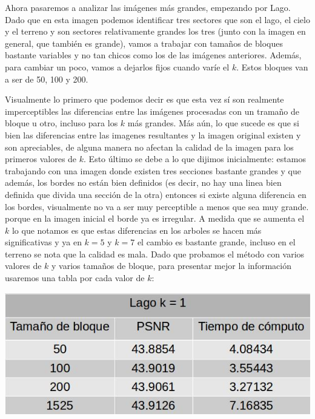 \documentclass[a4paper]{article}
\begin{document}
Ahora pasaremos a analizar las imágenes más grandes, empezando por Lago. Dado que en esta imagen podemos identificar tres sectores que son el lago, el cielo y el terreno y son sectores relativamente grandes los tres (junto con la imagen en general, que también es grande), vamos a trabajar con tamaños de bloques bastante variables y no tan chicos como los de las imágenes anteriores. Además, para cambiar un poco, vamos a dejarlos fijos cuando varíe el $k$. Estos bloques van a ser de 50, 100 y 200. 
\par Visualmente lo primero que podemos decir es que esta vez sí son realmente imperceptibles las diferencias entre las imágenes procesadas con un tramaño de bloque u otro, incluso para los $k$ más grandes. Más aún, lo que sucede es que si bien las diferencias entre las imagenes resultantes y la imagen original existen y son apreciables, de alguna manera no afectan la calidad de la imagen para los primeros valores de $k$. Esto último se debe a lo que dijimos inicialmente: estamos trabajando con una imagen donde existen tres secciones bastante grandes y que además, los bordes no están bien definidos (es decir, no hay una linea bien definida que divida una sección de la otra) entonces si existe alguna diferencia en los bordes, visualmente no va a ser muy perceptible a menos que sea muy grande. porque en la imagen inicial el borde ya es irregular. A medida que se aumenta el $k$ lo que notamos es que estas diferencias en los arboles se hacen más significativas y ya en $k = 5$ y $k = 7$   el cambio es bastante grande, incluso en el terreno se nota que la calidad es mala.
\newline \noindent Dado que probamos el método con varios valores de $k$ y varios tamaños de bloque, para presentar mejor la información usaremos una tabla por cada valor de $k$: 
\newline

\centerline{
\includegraphics[scale=0.5]{imagenes/lagok1Tabla.jpg}
}
\vspace{1cm}
\end{document}
